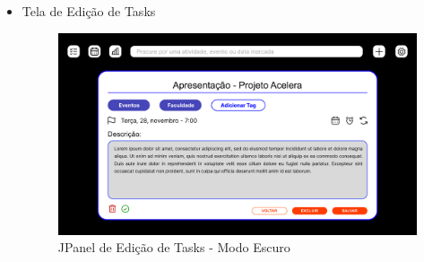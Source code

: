 \documentclass[a4paper,12pt]{article}
\begin{document}
\begin{itemize}
	\item Tela de Edição de Tasks
	\begin{figure}[H]
		\centering
		\includegraphics[scale=0.20]{prototypes/dark/Edit Task Panel Window.png}
		\caption{JPanel de Edição de Tasks - Modo Escuro}
	\end{figure}
\end{itemize}
\end{document}
